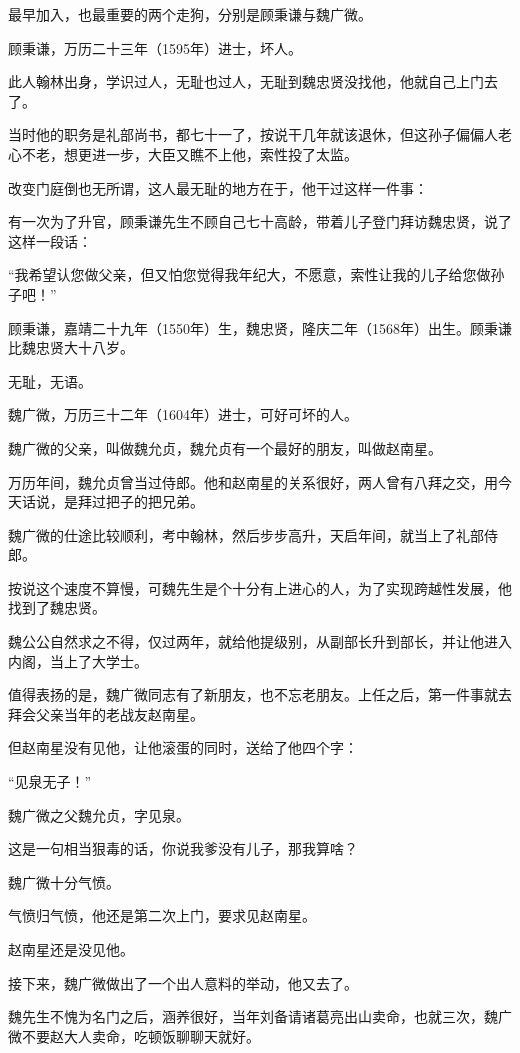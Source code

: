 \begin{multicols}{\theparacolNo}
最早加入，也最重要的两个走狗，分别是顾秉谦与魏广微。

顾秉谦，万历二十三年（1595年）进士，坏人。

此人翰林出身，学识过人，无耻也过人，无耻到魏忠贤没找他，他就自己上门去了。

当时他的职务是礼部尚书，都七十一了，按说干几年就该退休，但这孙子偏偏人老心不老，想更进一步，大臣又瞧不上他，索性投了太监。

改变门庭倒也无所谓，这人最无耻的地方在于，他干过这样一件事：

有一次为了升官，顾秉谦先生不顾自己七十高龄，带着儿子登门拜访魏忠贤，说了这样一段话：

“我希望认您做父亲，但又怕您觉得我年纪大，不愿意，索性让我的儿子给您做孙子吧！”

顾秉谦，嘉靖二十九年（1550年）生，魏忠贤，隆庆二年（1568年）出生。顾秉谦比魏忠贤大十八岁。

无耻，无语。

魏广微，万历三十二年（1604年）进士，可好可坏的人。

魏广微的父亲，叫做魏允贞，魏允贞有一个最好的朋友，叫做赵南星。

万历年间，魏允贞曾当过侍郎。他和赵南星的关系很好，两人曾有八拜之交，用今天话说，是拜过把子的把兄弟。

魏广微的仕途比较顺利，考中翰林，然后步步高升，天启年间，就当上了礼部侍郎。

按说这个速度不算慢，可魏先生是个十分有上进心的人，为了实现跨越性发展，他找到了魏忠贤。

魏公公自然求之不得，仅过两年，就给他提级别，从副部长升到部长，并让他进入内阁，当上了大学士。

值得表扬的是，魏广微同志有了新朋友，也不忘老朋友。上任之后，第一件事就去拜会父亲当年的老战友赵南星。

但赵南星没有见他，让他滚蛋的同时，送给了他四个字：

“见泉无子！”

魏广微之父魏允贞，字见泉。

这是一句相当狠毒的话，你说我爹没有儿子，那我算啥？

魏广微十分气愤。

气愤归气愤，他还是第二次上门，要求见赵南星。

赵南星还是没见他。

接下来，魏广微做出了一个出人意料的举动，他又去了。

魏先生不愧为名门之后，涵养很好，当年刘备请诸葛亮出山卖命，也就三次，魏广微不要赵大人卖命，吃顿饭聊聊天就好。


\end{multicols}
